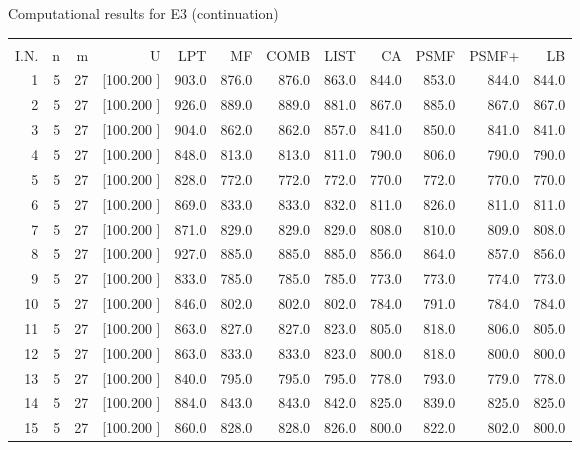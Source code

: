 \documentclass[12pt,a4paper]{article}
\begin{document}
\newpage
\begin{center}
 Computational results for E3 (continuation) {\tiny
\begin{tabular}{r r r r r r r r r r r r}\hline
    &   &   &          &        &        &        &        &        &        &        &       \\[-0.1in]
  I.N.  &  n  &  m  &  U  &  LPT  &  MF  &  COMB  &  LIST  &  CA  & PSMF &PSMF+ & LB \\[0.03in]
\hline
   1&  5& 27&[100.200   ]&   903.0&   876.0&   876.0&   863.0&   844.0&   853.0&   844.0&   844.0\\[-0.02in]
   2&  5& 27&[100.200   ]&   926.0&   889.0&   889.0&   881.0&   867.0&   885.0&   867.0&   867.0\\[-0.02in]
   3&  5& 27&[100.200   ]&   904.0&   862.0&   862.0&   857.0&   841.0&   850.0&   841.0&   841.0\\[-0.02in]
   4&  5& 27&[100.200   ]&   848.0&   813.0&   813.0&   811.0&   790.0&   806.0&   790.0&   790.0\\[-0.02in]
   5&  5& 27&[100.200   ]&   828.0&   772.0&   772.0&   772.0&   770.0&   772.0&   770.0&   770.0\\[-0.02in]
   6&  5& 27&[100.200   ]&   869.0&   833.0&   833.0&   832.0&   811.0&   826.0&   811.0&   811.0\\[-0.02in]
   7&  5& 27&[100.200   ]&   871.0&   829.0&   829.0&   829.0&   808.0&   810.0&   809.0&   808.0\\[-0.02in]
   8&  5& 27&[100.200   ]&   927.0&   885.0&   885.0&   885.0&   856.0&   864.0&   857.0&   856.0\\[-0.02in]
   9&  5& 27&[100.200   ]&   833.0&   785.0&   785.0&   785.0&   773.0&   773.0&   774.0&   773.0\\[-0.02in]
  10&  5& 27&[100.200   ]&   846.0&   802.0&   802.0&   802.0&   784.0&   791.0&   784.0&   784.0\\[-0.02in]
  11&  5& 27&[100.200   ]&   863.0&   827.0&   827.0&   823.0&   805.0&   818.0&   806.0&   805.0\\[-0.02in]
  12&  5& 27&[100.200   ]&   863.0&   833.0&   833.0&   823.0&   800.0&   818.0&   800.0&   800.0\\[-0.02in]
  13&  5& 27&[100.200   ]&   840.0&   795.0&   795.0&   795.0&   778.0&   793.0&   779.0&   778.0\\[-0.02in]
  14&  5& 27&[100.200   ]&   884.0&   843.0&   843.0&   842.0&   825.0&   839.0&   825.0&   825.0\\[-0.02in]
  15&  5& 27&[100.200   ]&   860.0&   828.0&   828.0&   826.0&   800.0&   822.0&   802.0&   800.0\\[-0.02in]

\end{tabular}}
\end{center}
\end{document}
